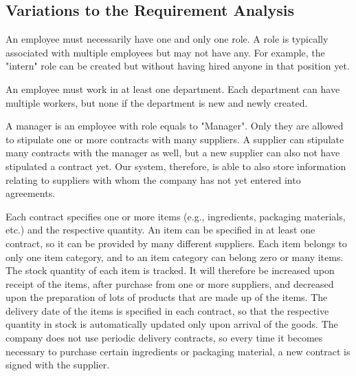 \subsection{Variations to the Requirement Analysis}

An employee must necessarily have one and only one role. A role is typically associated with multiple employees but may not have any. For example, the "intern" role can be created but without having hired anyone in that position yet.

An employee must work in at least one department. Each department can have multiple workers, but none if the department is new and newly created.

A manager is an employee with role equals to "Manager". Only they are allowed  to stipulate one or more contracts with many suppliers. A supplier can stipulate many contracts with the manager as well, but a new supplier can also not have stipulated a contract yet. Our system, therefore, is able to also store information relating to suppliers with whom the company has not yet entered into agreements.

Each contract specifies one or more items (e.g., ingredients, packaging materials, etc.) and the respective quantity. An item can be specified in at least one contract, so it can be provided by many different suppliers. Each item belongs to only one item category, and to an item category can belong zero or many items. The stock quantity of each item is tracked. It will therefore be increased upon receipt of the items, after purchase from one or more suppliers, and decreased upon the preparation of lots of products that are made up of the items. The delivery date of the items is specified in each contract, so that the respective quantity in stock is automatically updated only upon arrival of the goods. The company does not use periodic delivery contracts, so every time it becomes necessary to purchase certain ingredients or packaging material, a new contract is signed with the supplier.

